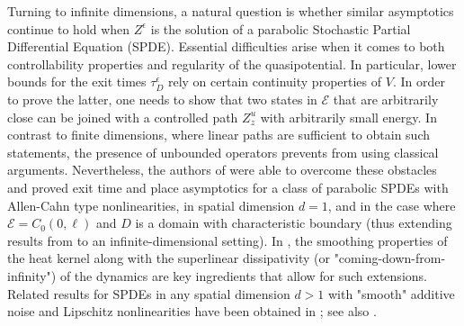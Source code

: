 \documentclass[10pt, reqno]{amsart}
\newcommand{\e}{\mathcal{E}}
\theoremstyle{definition}
\numberwithin{lem}{section}
\numberwithin{cor}{section}
\numberwithin{prop}{section}
\numberwithin{thm}{section}
\numberwithin{dfn}{section}
\begin{document}
   
   Turning to infinite dimensions, a natural question is whether similar asymptotics continue to hold when $Z^\epsilon$ is the solution of a parabolic Stochastic Partial Differential Equation (SPDE). Essential difficulties arise when it comes to both controllability properties and regularity of the quasipotential. In particular, lower bounds for the exit times $\tau^{\epsilon}_D$ rely on certain continuity properties of $V.$ In order to prove the latter, one needs to show that two states in $\e$ that are arbitrarily close can be joined with a controlled path $Z_z^u$ with arbitrarily small energy. In contrast to finite dimensions, where linear paths are sufficient to obtain such statements, the presence of unbounded operators prevents from using classical arguments. Nevertheless, the authors of \cite{salins2021metastability} were able to overcome these obstacles and proved exit time and place asymptotics for a class of parabolic SPDEs with Allen-Cahn type nonlinearities, in spatial dimension $d=1$, and in the case where $\e=C_0(0,\ell)$ and $D$ is a domain with characteristic boundary (thus extending results from \cite{day1990large} to an infinite-dimensional setting). In \cite{salins2021metastability}, the smoothing properties of the heat kernel along with the superlinear dissipativity (or "coming-down-from-infinity")  of the dynamics are key ingredients that allow for such extensions.  Related results for SPDEs in any spatial dimension $d>1$ with "smooth" additive noise and Lipschitz nonlinearities have been obtained in \cite{cerrai2011approximation}; see also \cite{chenal1997uniform, da1991minimum, debussche2013dynamics}.
   
\end{document}

